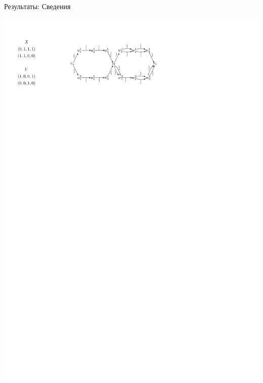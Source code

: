 \documentclass{beamer}
\begin{document}
\begin{frame}{Результаты: Сведения}
\begin{itemize}
		\begin{center}
			\includegraphics[scale=0.8]{./pictures/ov_to_cflr.pdf}
		\end{center}
	\end{itemize}
\end{frame}
\end{document}
